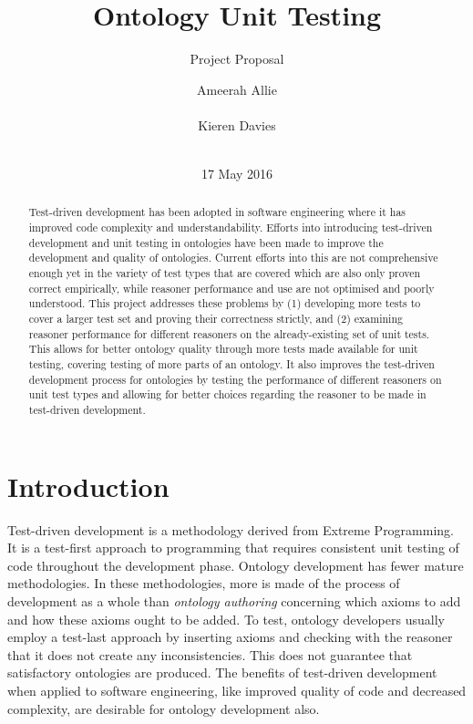 \documentclass[draft]{sig-alternate}
\begin{document}
\title{Ontology Unit Testing}
\subtitle{Project Proposal}
\author{
  \alignauthor
  Ameerah Allie\\
    \\
  \alignauthor
  Kieren Davies\\
   \\
}
\date{17 May 2016}
\maketitle

\begin{abstract}
  Test-driven development has been adopted in software engineering where it has improved code complexity and understandability. Efforts into introducing test-driven development and unit testing in ontologies have been made to improve the development and quality of ontologies. Current efforts into this are not comprehensive enough yet in the variety of test types that are covered which are also only proven correct empirically, while reasoner performance and use are not optimised and poorly understood. This project addresses these problems by (1) developing more tests to cover a larger test set and proving their correctness strictly, and (2) examining reasoner performance for different reasoners on the already-existing set of unit tests. This allows for better ontology quality through more tests made available for unit testing, covering testing of more parts of an ontology. It also improves the test-driven development process for ontologies by testing the performance of different reasoners on unit test types and allowing for better choices regarding the reasoner to be made in test-driven development.
\end{abstract}

\section{Introduction}

Test-driven development is a methodology derived from Extreme Programming. It is a test-first approach to programming that requires consistent unit testing of code throughout the development phase\cite{DBLP:journals/infsof/PancurC11}. Ontology development has fewer mature methodologies\cite{DBLP:journals/corr/KeetL15}. In these methodologies, more is made of the process of development as a whole than \textit{ontology authoring} concerning which axioms to add and how these axioms ought to be added. To test, ontology developers usually employ a test-last approach by inserting axioms and checking with the reasoner that it does not create any inconsistencies\cite{DBLP:journals/corr/KeetL15}. This does not guarantee that satisfactory ontologies are produced. The benefits of test-driven development when applied to software engineering, like improved quality of code and decreased complexity, are desirable for ontology development also.
\end{document}
